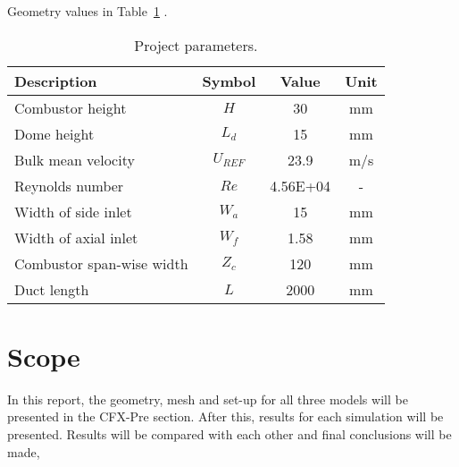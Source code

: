 Geometry values in Table~\ref{tab:param} \cite{art}.
\begin{table}[H]
  \centering
  \caption{Project parameters.}
    \begin{tabular}{lccc}
    \toprule
    \textbf{Description} & \textbf{Symbol} & \textbf{Value} & \textbf{Unit} \\
    \midrule
    Combustor height & $H$   & 30    & mm \\
    Dome height & $L_d$ & 15    & mm \\
    Bulk mean velocity & $U_{REF}$   & 23.9  & m/s \\
    Reynolds number & $Re$  & 4.56E+04 & - \\
    Width of side inlet & $W_a$ & 15    & mm \\
    Width of axial inlet & $W_f$ & 1.58  & mm \\
    Combustor span-wise width & $Z_c$ & 120   & mm \\
    Duct length & $L$   & 2000  & mm \\
    \bottomrule
    \end{tabular}%
  \label{tab:param}
\end{table}

\section{Scope}
In this report, the geometry, mesh and set-up for all three models will be presented in the CFX-Pre section. After this, results for each simulation will be presented. Results will be compared with each other and final conclusions will be made,
